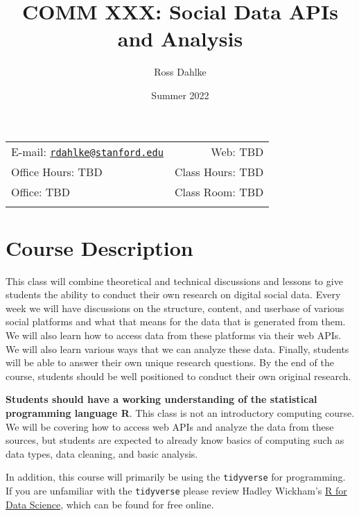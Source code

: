 \documentclass[11pt,]{article}
\title{COMM XXX: Social Data APIs and Analysis}
\author{Ross Dahlke}
\date{Summer 2022}
\begin{document}
  

		\maketitle
		
	
		\thispagestyle{firststyle}



	\noindent \begin{tabular*}{\textwidth}{ @{\extracolsep{\fill}} lr @{\extracolsep{\fill}}}


E-mail: \texttt{\href{mailto:rdahlke@stanford.edu}{\nolinkurl{rdahlke@stanford.edu}}} & Web: TBD\\
Office Hours: TBD  &  Class Hours: TBD\\
Office: TBD  & Class Room: TBD\\
	&  \\
	\hline
	\end{tabular*}
	
\vspace{2mm}
	


\hypertarget{course-description}{%
\section{Course Description}\label{course-description}}

This class will combine theoretical and technical discussions and
lessons to give students the ability to conduct their own research on
digital social data. Every week we will have discussions on the
structure, content, and userbase of various social platforms and what
that means for the data that is generated from them. We will also learn
how to access data from these platforms via their web APIs. We will also
learn various ways that we can analyze these data. Finally, students
will be able to answer their own unique research questions. By the end
of the course, students should be well positioned to conduct their own
original research.

\textbf{Students should have a working understanding of the statistical
programming language R}. This class is not an introductory computing
course. We will be covering how to access web APIs and analyze the data
from these sources, but students are expected to already know basics of
computing such as data types, data cleaning, and basic analysis.

In addition, this course will primarily be using the \texttt{tidyverse}
for programming. If you are unfamiliar with the \texttt{tidyverse}
please review Hadley Wickham's \href{https://r4ds.had.co.nz/}{R for Data
Science}, which can be found for free online.
\end{document}
